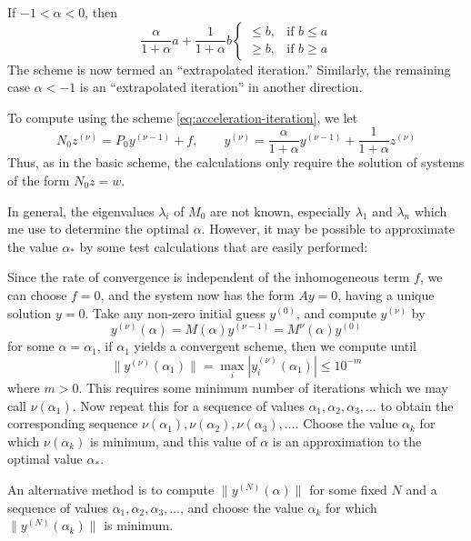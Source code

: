 \documentclass[../main.tex]{subfiles}
\begin{document}
If $-1 < \alpha < 0$, then
\begin{equation*}
	\frac{\alpha}{1 + \alpha} a + \frac{1}{1 + \alpha} b 
	\begin{cases}
		\leq b, & \text{if $b \leq a$}   \\
		\geq b, & \text{if $b \geq a$}
	\end{cases}
\end{equation*}
The scheme is now termed an ``extrapolated iteration.'' Similarly, the remaining case $\alpha < -1$ is an ``extrapolated iteration'' in another direction.

To compute using the scheme \eqref{eq:acceleration-iteration}, we let
\begin{equation*}
	N_0 z^{(\nu)} = P_0 y^{(\nu-1)} + f, \qquad y^{(\nu)} = \frac{\alpha}{1 + \alpha} y^{(\nu-1)} + \frac{1}{1 + \alpha} z^{(\nu)}
\end{equation*}
Thus, as in the basic scheme, the calculations only require the solution of systems of the form $N_0 z = w$.

In general, the eigenvalues $\lambda_i$ of $M_0$ are not known, especially $\lambda_1$ and $\lambda_n$ which me use to determine the optimal $\alpha$. However, it may be possible to approximate the value $\alpha_*$ by some test calculations that are easily performed:

Since the rate of convergence is independent of the inhomogeneous term $f$, we can choose $f = 0$, and the system now has the form $A y = 0$, having a unique solution $y = 0$. Take any non-zero initial guess $y^{(0)}$, and compute $y^{(\nu)}$ by
\begin{equation*}
	y^{(\nu)} (\alpha) = M(\alpha) y^{(\nu-1)} = M^{\nu}(\alpha) y^{(0)}
\end{equation*}
for some $\alpha = \alpha_1$, if $\alpha_1$ yields a convergent scheme, then we compute until
\begin{equation*}
	\| y^{(\nu)} (\alpha_1) \| = \max_i | y_i^{(\nu)} (\alpha_1) | \leq 10^{-m}
\end{equation*}
where $m>0$. This requires some minimum number of iterations which we may call $\nu(\alpha_1)$. Now repeat this for a sequence of values $\alpha_1, \alpha_2, \alpha_3, \ldots$ to obtain the corresponding sequence $\nu(\alpha_1), \nu(\alpha_2), \nu(\alpha_3), \ldots$. Choose the value $\alpha_k$ for which $\nu(\alpha_k)$ is minimum, and this value of $\alpha$ is an approximation to the optimal value $\alpha_*$.

An alternative method is to compute $\| y^{(N)} (\alpha) \|$ for some fixed $N$ and a sequence of values $\alpha_1, \alpha_2, \alpha_3, \ldots$, and choose the value $\alpha_k$ for which $\| y^{(N)} (\alpha_k) \|$ is minimum.
\end{document}
